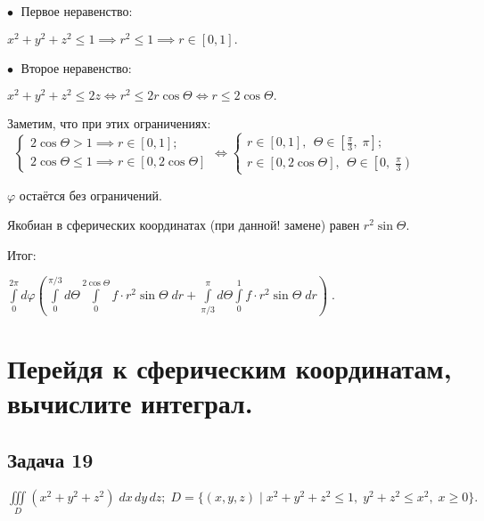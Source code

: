 \documentclass[a4paper, fleqn]{article}
\begin{document}
    $\bullet \; $ Первое неравенство:
    
    $x^2 + y^2 + z^2 \leq 1 \implies r^2 \leq 1 \implies r \in [0,1].$
    
    $\bullet \; $ Второе неравенство:
    
    $x^2 + y^2 + z^2 \leq 2z \iff r^2 \leq 2 r \cos \Theta \iff r \leq 2 \cos \Theta.$
    
    Заметим, что при этих ограничениях: $\; \; \begin{cases} 
    2 \cos \Theta > 1 \implies r \in [0,1];\\
    2 \cos \Theta \leq 1 \implies r \in [0, 2 \cos \Theta]
    \end{cases} \iff 
    \begin{cases} 
    r \in [0,1], \; \, \Theta \in \left[\frac{\pi}{3}, \; \pi \right];\\
    r \in \left[0, 2 \cos \Theta \right], \; \, \Theta \in \left[0, \; \frac{\pi}{3} \right)
    \end{cases}$
    
    $\varphi$ остаётся без ограничений.
    
    Якобиан в сферических координатах (при данной! замене) равен $r^2 \sin \Theta.$
    
    Итог:
    
    $\boxed{\displaystyle \int\limits_{0 }^{2 \pi} d \varphi\left( 
    \int\limits_{0 }^{\pi/3} d \Theta \int\limits_{0 }^{2 \cos \Theta} f \cdot r^2 \sin \Theta \; dr + 
    \int\limits_{\pi/3 }^{\pi} d \Theta \int\limits_{0 }^{1} f \cdot r^2 \sin \Theta \; dr
    \right) } \; .$
    
    
    
    
    
    \section*{Перейдя к сферическим координатам, вычислите интеграл.}
    
    
    \subsection*{Задача 19}
    
    $\displaystyle \iiint\limits_{D} (x^2 + y^2 + z^2) \; dx \, dy\, dz; \; D = \{(x,y,z) \mid x^2 + y^2 + z^2 \leq 1, \; y^2 + z^2 \leq x^2, \; x \geq 0 \}. $
    
\end{document}
